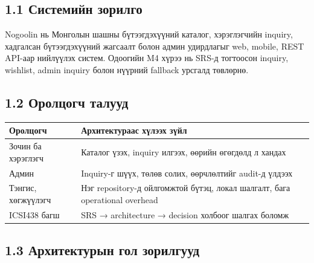 \documentclass[
  mongolian,
]{article}
\begin{document}
\subsection{1.1 Системийн
зорилго}\label{ux441ux438ux441ux442ux435ux43cux438ux439ux43d-ux437ux43eux440ux438ux43bux433ux43e}

Nogoolin нь Монголын шашны бүтээгдэхүүний каталог, хэрэглэгчийн inquiry,
хадгалсан бүтээгдэхүүний жагсаалт болон админ удирдлагыг web, mobile,
REST API-аар нийлүүлэх систем. Одоогийн M4 хүрээ нь SRS-д тогтоосон
inquiry, wishlist, admin inquiry болон нүүрний fallback урсгалд
төвлөрнө.

\subsection{1.2 Оролцогч
талууд}\label{ux43eux440ux43eux43bux446ux43eux433ux447-ux442ux430ux43bux443ux443ux434}

\begin{longtable}[]{@{}
  >{\raggedright\arraybackslash}p{}
  >{\raggedright\arraybackslash}p{}@{}}
\toprule\noalign{}
\begin{minipage}[b]{\linewidth}\raggedright
Оролцогч
\end{minipage} & \begin{minipage}[b]{\linewidth}\raggedright
Архитектураас хүлээх зүйл
\end{minipage} \\
\midrule\noalign{}
\endhead
\bottomrule\noalign{}
\endlastfoot
Зочин ба хэрэглэгч & Каталог үзэх, inquiry илгээх, өөрийн өгөгдөлд л
хандах \\
Админ & Inquiry-г шүүх, төлөв солих, өөрчлөлтийг audit-д үлдээх \\
Тэнгис, хөгжүүлэгч & Нэг repository-д ойлгомжтой бүтэц, локал шалгалт,
бага operational overhead \\
ICSI438 багш & SRS → architecture → decision холбоог шалгах боломж \\
\end{longtable}

\subsection{1.3 Архитектурын гол
зорилгууд}\label{ux430ux440ux445ux438ux442ux435ux43aux442ux443ux440ux44bux43d-ux433ux43eux43b-ux437ux43eux440ux438ux43bux433ux443ux443ux434}
\end{document}
